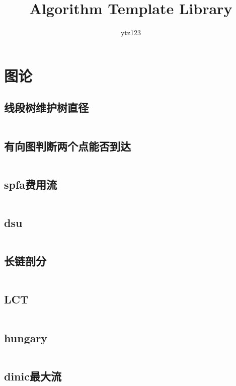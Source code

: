 \documentclass{article}
\author{ytz123}
\title{Algorithm Template Library}
\begin{document}
 
\maketitle %
\newpage %
\tableofcontents %
\newpage
\section{图论} %
\subsection{线段树维护树直径} %
\inputminted[breaklines]{c++}{../图论/线段树维护树直径.cpp} %

\subsection{有向图判断两个点能否到达} %
\inputminted[breaklines]{c++}{../图论/有向图判断两个点能否到达.cpp} %

\subsection{spfa费用流} %
\inputminted[breaklines]{c++}{../图论/spfa费用流.cpp} %

\subsection{dsu} %
\inputminted[breaklines]{c++}{../图论/dsu.cpp} %

\subsection{长链剖分} %
\inputminted[breaklines]{c++}{../图论/长链剖分.cpp} %

\subsection{LCT} %
\inputminted[breaklines]{c++}{../图论/LCT.cpp} %

\subsection{hungary} %
\inputminted[breaklines]{c++}{../图论/hungary.cpp} %

\subsection{dinic最大流} %
\inputminted[breaklines]{c++}{../图论/dinic最大流.cpp} %
\end{document}
